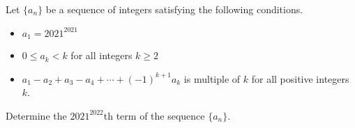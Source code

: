 Let $\{a_n\}$ be a sequence of integers satisfying the following conditions.
\begin{itemize}
	\item $a_1=2021^{2021}$
	\item $0 \le a_k < k$ for all integers $k \ge 2$
	\item $a_1-a_2+a_3-a_4+ \cdots + (-1)^{k+1}a_k$ is multiple of $k$ for all positive integers $k$.
\end{itemize}
Determine the $2021^{2022}$th term of the sequence $\{a_n\}$.